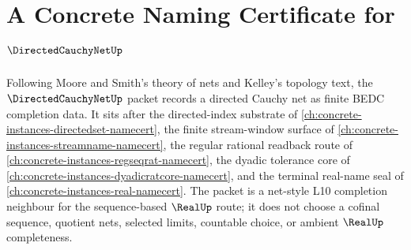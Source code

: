 \chapter{A Concrete Naming Certificate for $\DirectedCauchyNetUp$}
\label{ch:concrete-instances-directed-cauchy-net-namecert}

Following Moore and Smith's theory of nets and Kelley's topology text, the $\DirectedCauchyNetUp$ packet records a directed Cauchy net as finite BEDC completion data. It sits after the directed-index substrate of \autoref{ch:concrete-instances-directedset-namecert}, the finite stream-window surface of \autoref{ch:concrete-instances-streamname-namecert}, the regular rational readback route of \autoref{ch:concrete-instances-regseqrat-namecert}, the dyadic tolerance core of \autoref{ch:concrete-instances-dyadicratcore-namecert}, and the terminal real-name seal of \autoref{ch:concrete-instances-real-namecert}. The packet is a net-style L10 completion neighbour for the sequence-based $\RealUp$ route; it does not choose a cofinal sequence, quotient nets, selected limits, countable choice, or ambient $\RealUp$ completeness.



